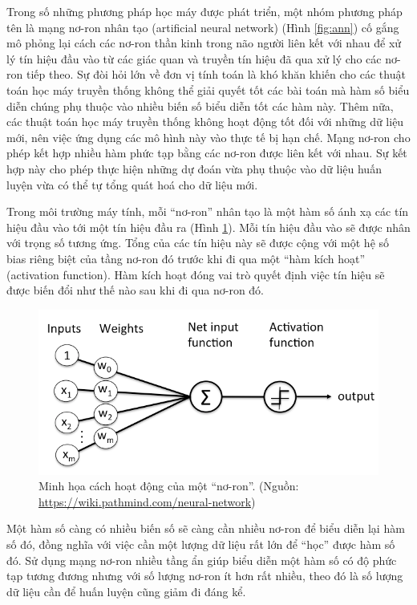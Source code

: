 Trong số những phương pháp học máy được phát triển, một nhóm phương pháp tên là mạng nơ-ron nhân tạo (artificial neural network) (Hình \ref{fig:ann}) cố gắng mô phỏng lại cách các nơ-ron thần kinh trong não người liên kết với nhau để xử lý tín hiệu đầu vào từ các giác quan và truyền tín hiệu đã qua xử lý cho các nơ-ron tiếp theo. Sự đòi hỏi lớn về đơn vị tính toán là khó khăn khiến cho các thuật toán học máy truyền thống không thể giải quyết tốt các bài toán mà hàm số biểu diễn chúng phụ thuộc vào nhiều biến số biểu diễn tốt các hàm này. Thêm nữa, các thuật toán học máy truyền thống không hoạt động tốt đối với những dữ liệu mới, nên việc ứng dụng các mô hình này vào thực tế bị hạn chế. Mạng nơ-ron cho phép kết hợp nhiều hàm phức tạp bằng các nơ-ron được liên kết với nhau. Sự kết hợp này cho phép thực hiện những dự đoán vừa phụ thuộc vào dữ liệu huấn luyện vừa có thể tự tổng quát hoá cho dữ liệu mới.

Trong môi trường máy tính, mỗi ``nơ-ron'' nhân tạo là một hàm số ánh xạ các tín hiệu đầu vào tới một tín hiệu đầu ra (Hình \ref{fig:perceptron-node}). Mỗi tín hiệu đầu vào sẽ được nhân với trọng số tương ứng. Tổng của các tín hiệu này sẽ được cộng với một hệ số bias riêng biệt của tầng nơ-ron đó trước khi đi qua một ``hàm kích hoạt'' (activation function). Hàm kích hoạt đóng vai trò quyết định việc tín hiệu sẽ được biến đổi như thế nào sau khi đi qua nơ-ron đó.

\begin{figure}[htp]
\centering
\includegraphics[width=120 mm]{images/perceptron-node.png}
\caption{Minh họa cách hoạt động của một ``nơ-ron''. (Nguồn: \url{https://wiki.pathmind.com/neural-network})}
\label{fig:perceptron-node}
\end{figure}

Một hàm số càng có nhiều biến số sẽ càng cần nhiều nơ-ron để biểu diễn lại hàm số đó, đồng nghĩa với việc cần một lượng dữ liệu rất lớn để ``học'' được hàm số đó. Sử dụng mạng nơ-ron nhiều tầng ẩn giúp biểu diễn một hàm số có độ phức tạp tương đương nhưng với số lượng nơ-ron ít hơn rất nhiều, theo đó là số lượng dữ liệu cần để huấn luyện cũng giảm đi đáng kể\cite{bengio2007scaling}.

